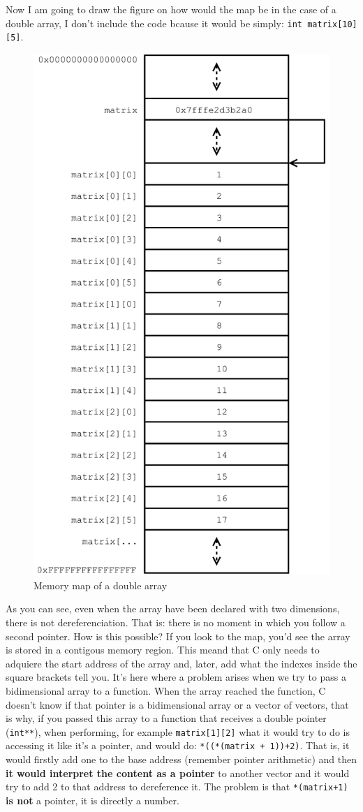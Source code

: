 \documentclass[a4paper]{article}
\begin{document}
Now I am going to draw the figure on how would the map be in the case of a
double array, I don't include the code bcause it would be simply:
\lstinline[style=C]!int matrix[10][5]!.

\begin{figure}[H]
    \center
    \includegraphics[width=.5\linewidth]{double_array_map}
    \caption{Memory map of a double array}
    \label{img:double_array_map}
\end{figure}

As you can see, even when the array have been declared with two dimensions,
there is not dereferenciation. That is: there is no moment in which you follow a
second pointer. How is this possible? If you look to the map, you'd see the
array is stored in a contigous memory region. This meand that C only needs to
adquiere the start address of the array and, later, add what the indexes
inside the square brackets tell you. It's here where a problem arises when we
try to pass a bidimensional array to a function. When the array reached the
function, C doesn't know if that pointer is a bidimensional array or a vector
of vectors, that is why, if you passed this array to a function that receives a
double pointer (\verb!int**!), when performing, for example \verb!matrix[1][2]!
what it would try to do is accessing it like it's a pointer, and would do:
\verb!*((*(matrix + 1))+2)!. That is, it would firstly add one to the base
address (remember pointer arithmetic) and then \textbf{it would interpret the
content as a pointer} to another vector and it would try to add 2 to that
address to dereference it. The problem is that \verb!*(matrix+1)!
\textbf{is not} a pointer, it is directly a number.
\end{document}
